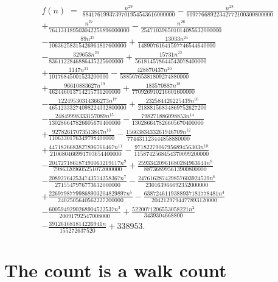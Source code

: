 \documentclass[11pt,a4paper]{article}
\theoremstyle{plain}
\theoremstyle{definition}
\begin{document}
\begin{multline*}
f(n)\;=\;\frac{n^{29}}{8841761993739701954543616000000} - \frac{n^{28}}{60977668922342772100300800000} \\
+ \frac{n^{27}}{764131189503042256896000000} - \frac{n^{26}}{254710396501014085632000000} \\
- \frac{89 n^{25}}{10636258315426961817600000} + \frac{13033 n^{24}}{14890761641597746544640000} \\
- \frac{329653 n^{23}}{8361122846886435225600000} + \frac{15731 n^{22}}{561814578644543078400000} \\
+ \frac{1147 n^{21}}{10176845001523200000} - \frac{428870437 n^{20}}{58856765381809274880000} \\
+ \frac{96610883627 n^{19}}{462446013714215731200000} + \frac{183570887 n^{18}}{770926910216601600000} \\
- \frac{12249530314366273 n^{17}}{46512333274098224332800000} + \frac{232584426225439 n^{16}}{21888156834869752627200} \\
- \frac{24849998333157089 n^{15}}{130286647826605670400000} - \frac{798271886098853 n^{14}}{130286647826605670400000} \\
+ \frac{92782617073513847 n^{13}}{1106330176349798400000} - \frac{1566383433261946709 n^{12}}{774431123444858880000} \\
+ \frac{4471826683827896766467 n^{11}}{210680466991703654400000} - \frac{9718227906795689456303 n^{10}}{1158742568454370099200000} \\
- \frac{204727186187491063219117 n^{9}}{79863209605251072000000} + \frac{25933420961680284963641 n^{8}}{887368995613900800000} \\
- \frac{208927642534743574258367 n^{7}}{2715547976773632000000} - \frac{247616287429857603924539 n^{6}}{230163966692352000000} \\
+ \frac{22697987799868903204829897 n^{5}}{2402505640562227200000} - \frac{6387246119388937181778481 n^{4}}{2042129794477893120000} \\
- \frac{6005949290268904522537 n^{3}}{20091792547008000} + \frac{5220071206553058221 n^{2}}{3439304668800} \\
- \frac{391261681814226941 n}{155272637520} + 338953.
\end{multline*}

\section{The count is a walk count}
\end{document}
